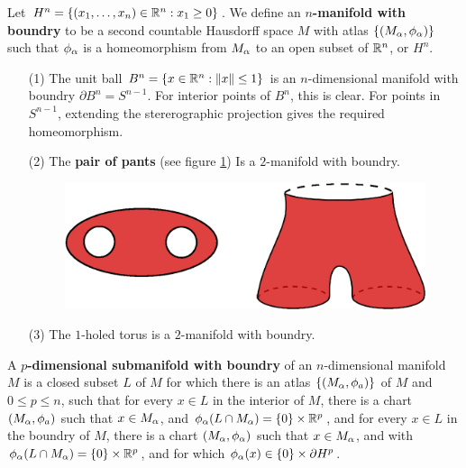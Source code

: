\begin{definition}
    Let $H^n=\{(x_1, \dots, x_n) \in \mathbb{R}^n : x_1 \geq 0\}$. We define an
   \textbf{$n$-manifold with boundry}  to be a second countable Hausdorff space
   $M$ with atlas  $\{(M_\alpha,\phi_\alpha)\}$ such that $\phi_\alpha$ is a homeomorphism
   from  $M_\alpha$ to an open subset of  $\mathbb{R}^n$, or $H^n$.
\end{definition}

\begin{example}\label{example_1.3}
    \begin{enumerate}
        \item[(1)] The unit ball $B^n=\{x \in \mathbb{R}^n : \|x\| \leq 1\}$ is an
            $n$-dimensional manifold with boundry  $\partial{B^n}=S^{n-1}$. For
            interior points of $B^n$, this is clear. For points in  $S^{n-1}$,
            extending the stererographic projection gives the required
            homeomorphism.

        \item[(2)] The \textbf{pair of pants} (see figure \ref{fig_1.3}) Is a
            $2$-manifold with boundry.
             \begin{figure}[h]
                \centering
                \includegraphics[scale=0.5]{Figures/Chapter1/pair_of_pants.eps}
                \caption{}
                \label{fig_1.3}
            \end{figure}

        \item[(3)] The $1$-holed torus is a  $2$-manifold with boundry.
    \end{enumerate}
\end{example}

\begin{definition}
    A \textbf{$p$-dimensional submanifold with boundry} of an $n$-dimensional
    manifold  $M$ is a closed subset  $L$ of  $M$ for which there is an atlas
    $\{(M_\alpha,\phi_a)\}$ of $M$ and  $0 \leq p \leq n$, such that for every $x
    \in L$ in the interior of  $M$, there is a chart  $(M_\alpha,\phi_a)$ such that
    $x \in M_\alpha$, and  $\phi_\alpha(L \cap M_\alpha)=\{0\} \times \mathbb{R}^p$, and for every
    $x \in L$ in the boundry of  $M$, there is a chart  $(M_\alpha,\phi_\alpha)$ such
    that $x \in M_\alpha$, and with  $\phi_\alpha(L \cap M_\alpha)=\{0\} \times \mathbb{R}^p$, and
    for which $\phi_\alpha(x) \in \{0\} \times \partial{H^p}$.
\end{definition}


